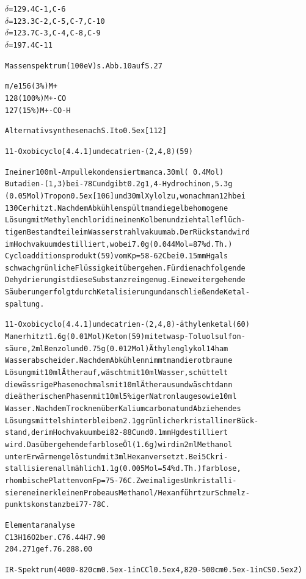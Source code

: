 \documentclass[a4paper,11pt]{article}
\begin{document}
\begin{alltt}
          \(\delta\) = 129.4           C-1, C-6
          \(\delta\) = 123.3           C-2, C-5, C-7, C-10
          \(\delta\) = 123.7           C-3, C-4, C-8, C-9
          \(\delta\) = 197.4           C-11

Massenspektrum (100 eV) s. Abb. 10 auf S. 27

m/e       156     (3 \%)       M+
          128   (100 \%)       M+ - CO
          127    (15 \%)       M+ - CO - H

\newpage
{}


Alternativsynthese nach S. Ito \raise0.5ex\hbox{[112]}

11-Oxobicyclo[4.4.1]undecatrien-(2‚4,8) (59)

In einer 100 ml - Ampulle kondensiert man ca. 30 ml (~0.4 Mol)
Butadien-(1,3) bei -78\degree{}C und gibt 0.2 g 1,4-Hydrochinon, 5.3 g
(0.05 Mol) Tropon \raise0.5ex\hbox{[106]} und 30 ml Xylol zu, wonach man 12 h bei
130\degree{}C erhitzt. Nach dem Abkühlen spült man die gelbe homogene
Lösung mit Methylenchlorid in einen Kolben und zieht alle flüch-
tigen Bestandteile im Wasserstrahlvakuum ab. Der Rückstand wird
im Hochvakuum destilliert, wobei 7.0 g (0.044 Mol = 87 \% d.Th.)
Cycloadditionsprodukt (59) vom Kp = 58 - 62\degree{}C bei 0.15 mm Hg als
schwach grünliche Flüssigkeit übergehen. Für die nachfolgende
Dehydrierung ist diese Substanz rein genug. Eine weitergehende
Säuberung erfolgt durch Ketalisierung und anschließende Ketal-
spaltung.

11-Oxobicyclo[4.4.1]undecatrien-(2,4,8)-äthylenketal (60)
Man erhitzt 1.6 g (0.01 Mol) Keton (59) mit etwas p-Toluolsulfon-
säure, 2 ml Benzol und 0.75 g (0.012 Mol) Äthylenglykol 14 h am
Wasserabscheider. Nach dem Abkühlen nimmt man die rotbraune
Lösung mit 10 ml Äther auf, wäscht mit 10 ml Wasser, schüttelt
die wässrige Phase nochmals mit 10 ml Äther aus und wäscht dann
die ätherischen Phasen mit 10 ml 5 \%iger Natronlauge sowie 10 ml
Wasser. Nach dem Trocknen über Kaliumcarbonat und Abziehen des
Lösungsmittels hinterbleiben 2.1 g grünlicher kristalliner Bück-
stand, der im Hochvakuum bei 82 - 88\degree{}C und 0.1 mm Hg destilliert
wird. Das übergehende farblose Öl (1.6 g) wird in 2 ml Methanol
unter Erwärmen gelöst und mit 3 ml Hexan versetzt. Bei 5\degree{}C kri-
stallisieren allmählich 1.1 g (0.005 Mol = 54 \% d.Th.) farblose,
rhombische Platten vom Fp = 75 - 76\degree{}C. Zweimaliges Umkristalli-
sieren einer kleinen Probe aus Methanol/Hexan führt zur Schmelz-
punktskonstanz bei 77 - 78\degree{}C.

Elementaranalyse
C13H16O2     ber.    C  76.44   H  7.90
204.271      gef.       76.28      8.00

\newpage
{}


IR-Spektrum (4000-820 cm\raise0.5ex\hbox{-1} in CCl\lower0.5ex\hbox{4}, 820-500 cm\raise0.5ex\hbox{-1} in CS\lower0.5ex\hbox{2})
\end{alltt}
\end{document}
